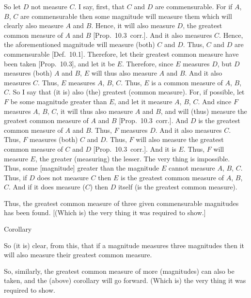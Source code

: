 \begin{Parallel}{}{}
{So let $D$ not measure $C$. I say, first, that $C$ and $D$ are
commensurable. For if $A$, $B$, $C$ are commensurable then some
magnitude will measure them which will clearly also measure $A$ and $B$.
Hence, it will also measure $D$, the greatest common measure of $A$ and $B$ [Prop.~10.3~corr.]. And it also measures
$C$. Hence, the aforementioned magnitude will measure (both)
$C$ and $D$. Thus, $C$ and $D$ are commensurable [Def.~10.1]. Therefore, let their
greatest common measure have been taken [Prop.~10.3], and let it be $E$. Therefore, since
$E$ measures $D$, but $D$ measures (both) $A$ and $B$, $E$ will
thus also measure $A$ and $B$. And it also measures $C$. Thus,
$E$ measures $A$, $B$, $C$. Thus, $E$ is a common measure of $A$, $B$, $C$.  So I say that (it is) also (the) greatest (common measure). For, if
possible, let $F$ be some magnitude greater than $E$, and let it
measure $A$, $B$, $C$. And since $F$ measures $A$, $B$, $C$, it will
thus also measure $A$ and $B$, and  will (thus) measure the greatest common measure of $A$ and $B$ [Prop.~10.3~corr.].  And
$D$ is the greatest common measure of $A$ and $B$.  Thus, $F$ measures $D$. And it also measures $C$. Thus, $F$ measures (both) $C$ and $D$.
Thus, $F$ will also measure the greatest common measure of $C$ and $D$  [Prop.~10.3~corr.].
And it is $E$. Thus, $F$ will measure $E$, the greater (measuring)
the lesser. The very thing is impossible. Thus, some [magnitude]
greater than the magnitude $E$ cannot measure $A$, $B$, $C$. Thus,
if $D$ does not
measure $C$ then
$E$ is the greatest common measure of $A$, $B$, $C$.  And if it does measure ($C$) then $D$ itself (is the
greatest common measure).

Thus, the greatest common measure  of three given
commensurable magnitudes has been found.  [(Which is) the very thing it was required to
show.]\\

\begin{center}
{\large Corollary}
\end{center}\vspace*{-7pt}

So (it is) clear, from this, that if a magnitude measures three
magnitudes then it will also measure their greatest common measure.

So, similarly, the greatest common measure of more (magnitudes) can also be
taken, and the (above) corollary will go forward. (Which is) the very thing
it was required to show.}
\end{Parallel}~\\

